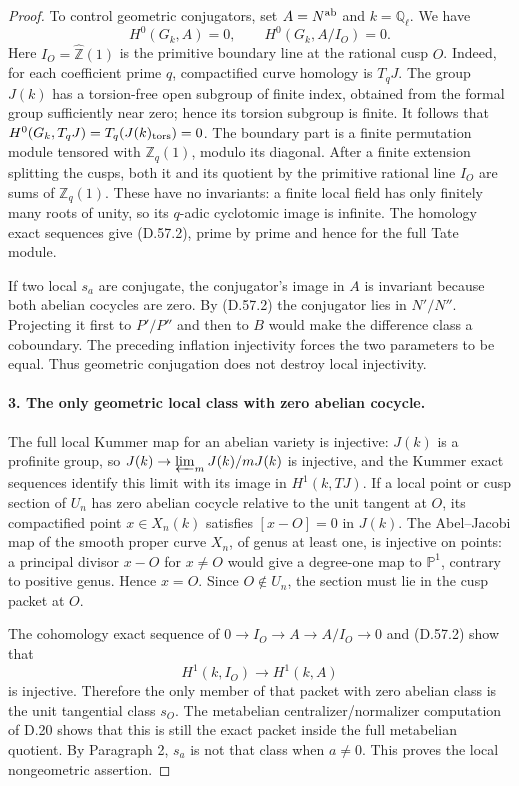 \begin{proof}
To control geometric conjugators, set
$A=N^{\rm ab}$ and $k=\mathbb Q_\ell$.  We have
\[
 H^0(G_k,A)=0,\qquad H^0(G_k,A/I_O)=0.                 \tag{D.57.2}
\]
Here $I_O=\widehat{\mathbb Z}(1)$ is the primitive boundary
line at the rational cusp $O$.  Indeed, for each coefficient
prime $q$, compactified curve homology is $T_qJ$.
The group $J(k)$ has a torsion-free open subgroup of finite
index, obtained from the formal group sufficiently near zero;
hence its torsion subgroup is finite.  It follows that
$H^0(G_k,T_qJ)=T_q(J(k)_{\rm tors})=0$.  The boundary part
is a finite permutation module tensored with $\mathbb Z_q(1)$,
modulo its diagonal.  After a finite extension splitting the
cusps, both it and its quotient by the primitive rational line
$I_O$ are sums of $\mathbb Z_q(1)$.  These have no invariants:
a finite local field has only finitely many roots of unity,
so its $q$-adic cyclotomic image is infinite.  The homology
exact sequences give (D.57.2), prime by prime and hence for the
full Tate module.

If two local $s_a$ are conjugate, the conjugator's image in
$A$ is invariant because both abelian cocycles are zero.
By (D.57.2) the conjugator lies in $N'/N''$.  Projecting it first
to $P'/P''$ and then to $B$ would make the difference class a
coboundary.  The preceding inflation injectivity forces the
two parameters to be equal.  Thus geometric conjugation does
not destroy local injectivity.

\paragraph{3. The only geometric local class with zero abelian cocycle.}

The full local Kummer map for an abelian variety is injective:
$J(k)$ is a profinite group, so
$J(k)\to\varprojlim_m J(k)/mJ(k)$ is injective, and the Kummer
exact sequences identify this limit with its image in
$H^1(k,TJ)$.  If a local point or cusp section of $U_n$ has
zero abelian cocycle relative to the unit tangent at $O$, its
compactified point $x\in X_n(k)$ satisfies
$[x-O]=0$ in $J(k)$.  The Abel--Jacobi map of the smooth proper
curve $X_n$, of genus at least one, is injective on points:
a principal divisor $x-O$ for $x\ne O$ would give a degree-one
map to $\mathbb P^1$, contrary to positive genus.  Hence
$x=O$.  Since $O\notin U_n$, the section must lie in the cusp
packet at $O$.

The cohomology exact sequence of
$0\to I_O\to A\to A/I_O\to0$ and (D.57.2) show that
\[
                H^1(k,I_O)\longrightarrow H^1(k,A)
\]
is injective.  Therefore the only member of that packet with
zero abelian class is the unit tangential class $s_O$.
The metabelian centralizer/normalizer computation of D.20
shows that this is still the exact packet inside the full
metabelian quotient.  By Paragraph 2, $s_a$ is not that class
when $a\ne0$.  This proves the local nongeometric assertion.


\end{proof}
